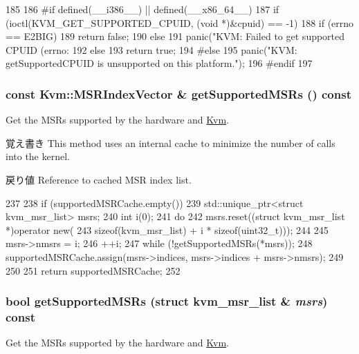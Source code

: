\begin{DoxyCode}
185 {
186 #if defined(__i386__) || defined(__x86_64__)
187     if (ioctl(KVM_GET_SUPPORTED_CPUID, (void *)&cpuid) == -1) {
188         if (errno == E2BIG)
189             return false;
190         else
191             panic("KVM: Failed to get supported CPUID (errno: %
192     } else
193         return true;
194 #else
195     panic("KVM: getSupportedCPUID is unsupported on this platform.\n");
196 #endif
197 }
\end{DoxyCode}
\hypertarget{classKvm_ab43b4ff4aabd353eef30f8defba2718d}{
\subsubsection[{getSupportedMSRs}]{\setlength{\rightskip}{0pt plus 5cm}const {\bf Kvm::MSRIndexVector} \& getSupportedMSRs () const}}
\label{classKvm_ab43b4ff4aabd353eef30f8defba2718d}
Get the MSRs supported by the hardware and \hyperlink{classKvm}{Kvm}.

\begin{DoxyNote}{覚え書き}
This method uses an internal cache to minimize the number of calls into the kernel.
\end{DoxyNote}
\begin{DoxyReturn}{戻り値}
Reference to cached MSR index list. 
\end{DoxyReturn}



\begin{DoxyCode}
237 {
238     if (supportedMSRCache.empty()) {
239         std::unique_ptr<struct kvm_msr_list> msrs;
240         int i(0);
241         do {
242             msrs.reset((struct kvm_msr_list *)operator new(
243                            sizeof(kvm_msr_list) + i * sizeof(uint32_t)));
244 
245             msrs->nmsrs = i;
246             ++i;
247         } while (!getSupportedMSRs(*msrs));
248         supportedMSRCache.assign(msrs->indices, msrs->indices + msrs->nmsrs);
249     }
250 
251     return supportedMSRCache;
252 }
\end{DoxyCode}
\hypertarget{classKvm_a3ae50dd2ddc035995d7578481b35e877}{
\subsubsection[{getSupportedMSRs}]{\setlength{\rightskip}{0pt plus 5cm}bool getSupportedMSRs (struct kvm\_\-msr\_\-list \& {\em msrs}) const}}
\label{classKvm_a3ae50dd2ddc035995d7578481b35e877}
Get the MSRs supported by the hardware and \hyperlink{classKvm}{Kvm}.

